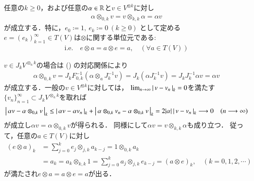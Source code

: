 	\begin{screen}
		\begin{thm}[$T(V)$の単位元]
			任意の$k \geq 0$，および任意の$\alpha \in \mathbb{R}$と$v \in V^{\otimes k}$に対し
			\begin{align}
				\alpha \otimes_{0,k} v = v \otimes_{k,k} \alpha = \alpha v
				\label{eq:thm_identity_element_of_T_V}
			\end{align}
			が成立する．特に，$e_0 \coloneqq 1,\ e_k \coloneqq 0\ (k \geq 0)$
			として定める$e=(e_k)_{k=1}^\infty \in T(V)$は$\otimes$に関する単位元である:
			\begin{align}
				\mbox{i.e.}\quad
				e \otimes a = a \otimes e = a,
				\quad (\forall a \in T(V))
			\end{align}
		\end{thm}
	\end{screen}
	
	\begin{prf}
		$v \in J_k V^{\otimes_a k}$の場合は
		()
		の対応関係により
		\begin{align}
			\alpha \otimes_{0,k} v
			= J_k F_{0,k}^{-1}\left( \alpha \otimes_a J_k^{-1}v \right)
			= J_k \left( \alpha J_k^{-1}v \right)
			= J_k J_k^{-1} \alpha v
			= \alpha v
		\end{align}
		が成立する．一般の$v \in V^{\otimes k}$に対しては，
		$\lim_{n \to \infty} \left|\, v-v_n\, \right|_{k} = 0$を満たす
		$\{v_n\}_{n=1}^\infty \subset J_k V^{\otimes_a k}$を取れば
		\begin{align}
			\left|\, \alpha v - \alpha \otimes_{0,k} v\, \right|_{k}
			\leq \left|\, \alpha v - \alpha v_n\, \right|_{k}
				+ \left|\, \alpha \otimes_{0,k} v_n - \alpha \otimes_{0,k} v\, \right|_{k}
			= 2|\alpha| \left|\, v-v_n\, \right|_{k}
			\longrightarrow 0
			\quad (n \longrightarrow \infty)
		\end{align}
		が成立し$\alpha v = \alpha \otimes_{0,k} v$が得られる．
		同様にして$\alpha v = v \otimes_{k,k} \alpha$も成り立つ．
		従って，任意の$a \in T(V)$に対し
		\begin{align}
			(e \otimes a)_k
			&= \sum_{j=0}^k e_j \otimes_{j,k} a_{k-j}
			= 1 \otimes_{0,k} a_k \\
			&= a_k
			= a_k \otimes_{k,k} 1
			= \sum_{j=0}^k a_j \otimes_{j,k} e_{k-j}
			= (a \otimes e)_k,
			\quad (k=0,1,2,\cdots)
		\end{align}
		が満たされ$e \otimes a = a \otimes e = a$が出る．
		\QED
	\end{prf}
	
